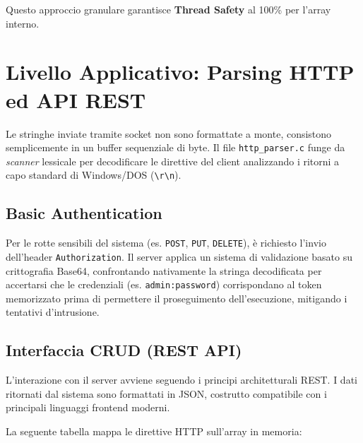 \documentclass[a4paper,12pt]{article}
\begin{document}
Questo approccio granulare garantisce \textbf{Thread Safety} al 100\% per l'array interno.

\newpage
\section{Livello Applicativo: Parsing HTTP ed API REST}

Le stringhe inviate tramite socket non sono formattate a monte, consistono semplicemente in un buffer sequenziale di byte. Il file \texttt{http\_parser.c} funge da \textit{scanner} lessicale per decodificare le direttive del client analizzando i ritorni a capo standard di Windows/DOS (\texttt{\textbackslash r\textbackslash n}).

\subsection{Basic Authentication}
Per le rotte sensibili del sistema (es. \texttt{POST}, \texttt{PUT}, \texttt{DELETE}), è richiesto l'invio dell'header \texttt{Authorization}. Il server applica un sistema di validazione basato su crittografia Base64, confrontando nativamente la stringa decodificata per accertarsi che le credenziali (es. \texttt{admin:password}) corrispondano al token memorizzato prima di permettere il proseguimento dell'esecuzione, mitigando i tentativi d'intrusione.

\subsection{Interfaccia CRUD (REST API)}
L'interazione con il server avviene seguendo i principi architetturali REST. I dati ritornati dal sistema sono formattati in JSON, costrutto compatibile con i principali linguaggi frontend moderni. 

La seguente tabella mappa le direttive HTTP sull'array in memoria:
\end{document}
